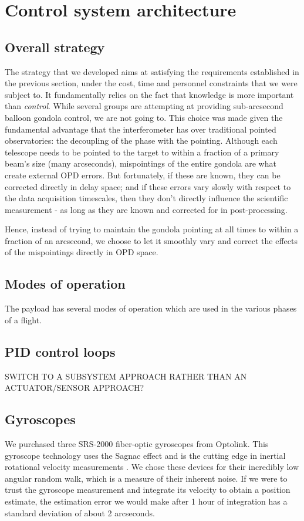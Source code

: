 \section{Control system architecture}
\subsection{Overall strategy}

The strategy that we developed aims at satisfying the requirements established in the previous section, under the cost, time and personnel constraints that we were subject to. It fundamentally relies on the fact that knowledge is more important than \textit{control}. While several groups are attempting at providing sub-arcsecond balloon gondola control, we are not going to. This choice was made given the fundamental advantage that the interferometer has over traditional pointed observatories: the decoupling of the phase with the pointing. Although each telescope needs to be pointed to the target to within a fraction of a primary beam's size (many arcseconds), mispointings of the entire gondola are what create external OPD errors. But fortunately, if these are known, they can be corrected directly in delay space; and if these errors vary slowly with respect to the data acquisition timescales, then they don't directly influence the scientific measurement - as long as they are known and corrected for in post-processing.

Hence, instead of trying to maintain the gondola pointing at all times to within a fraction of an arcsecond, we choose to let it smoothly vary and correct the effects of the mispointings directly in OPD space.
\subsection{Modes of operation}

The payload has several modes of operation which are used in the various phases of a flight.
\subsection{PID control loops}
SWITCH TO A SUBSYSTEM APPROACH RATHER THAN AN ACTUATOR/SENSOR APPROACH?

\subsection{Gyroscopes}

We purchased three SRS-2000 fiber-optic gyroscopes from Optolink. This gyroscope technology uses the Sagnac effect and is the cutting edge in inertial rotational velocity measurements \citep[for a review of the state-of-the-art see, \textit{e.g.}][]{ElBadaoui:2014fr}. We chose these devices for their incredibly low angular random walk, which is a measure of their inherent noise. If we were to trust the gyroscope measurement and integrate its velocity to obtain a position estimate, the estimation error we would make after 1 hour of integration has a standard deviation of about 2 arcseconds.

